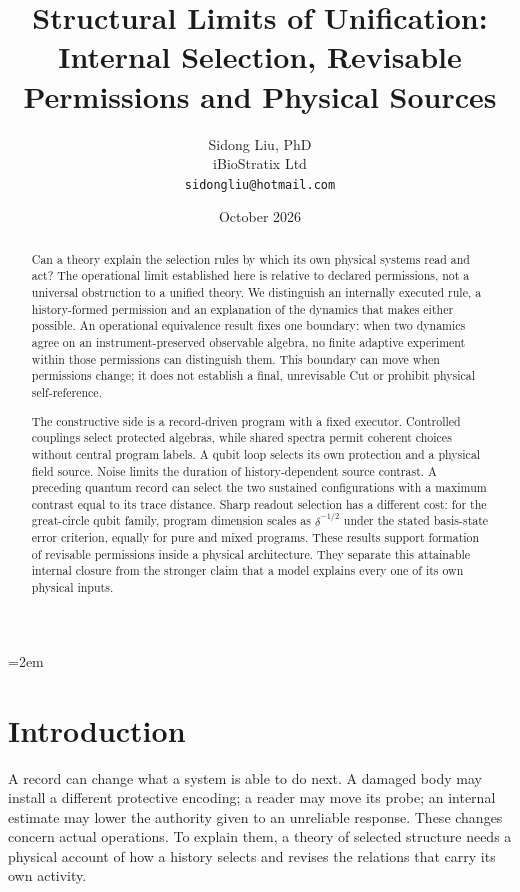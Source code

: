 \documentclass[12pt,a4paper]{article}
\title{Structural Limits of Unification:\\
Internal Selection, Revisable Permissions and Physical Sources}
\author{
  Sidong Liu, PhD \\
  iBioStratix Ltd \\
  \texttt{sidongliu@hotmail.com}
}
\date{October 2026}
\begin{document}
\emergencystretch=2em
\raggedbottom
{}

\maketitle

\begin{abstract}
Can a theory explain the selection rules by which its own physical systems
read and act? The operational limit established here is relative to
declared permissions, not a universal obstruction to a unified theory.
We distinguish an internally executed rule, a history-formed
permission and an explanation of the dynamics that makes either possible.
An operational equivalence result fixes one boundary: when two dynamics
agree on an instrument-preserved observable algebra, no finite adaptive
experiment within those permissions can distinguish them. This boundary
can move when permissions change; it does not establish a final,
unrevisable Cut or prohibit physical self-reference.

The constructive side is a record-driven program with a fixed executor.
Controlled couplings select protected algebras, while shared spectra permit
coherent choices without central program labels. A qubit loop selects its
own protection and a physical field source. Noise limits the duration of
history-dependent source contrast. A preceding quantum record can select
the two sustained configurations with a maximum contrast equal to its
trace distance. Sharp readout selection has a different cost: for the
great-circle qubit family, program dimension scales as
$\delta^{-1/2}$ under the stated basis-state error criterion, equally for
pure and mixed programs. These results support formation of revisable
permissions inside a physical architecture. They separate this attainable
internal closure from the stronger claim that a model explains every
one of its own physical inputs.
\end{abstract}

\section{Introduction}
\label{sec:intro}

A record can change what a system is able to do next. A damaged body may install a different protective encoding; a reader may move its probe; an internal estimate may lower the authority given to an unreliable response. These changes concern actual operations. To explain them, a theory of selected structure needs a physical account of how a history selects and revises the relations that carry its own activity.
\end{document}
